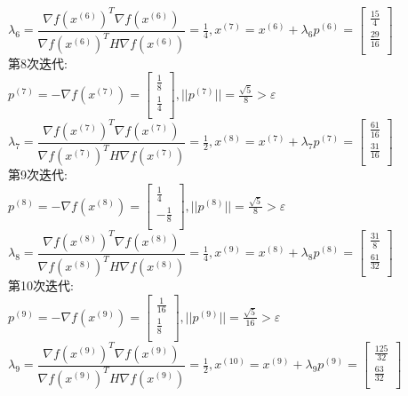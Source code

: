 \begin{solution}
    $\lambda_6=\dfrac{\nabla f(x^{(6)})^T\nabla f(x^{(6)})}{\nabla f(x^{(6)})^TH\nabla f(x^{(6)})}=\frac{1}{4},x^{(7)}=x^{(6)}+\lambda_6p^{(6)}=\begin{bmatrix} \frac{15}{4}\\\frac{29}{16}\\\end{bmatrix}$\\
    第8次迭代:\\
    $p^{(7)}=-\nabla f(x^{(7)})=\begin{bmatrix} \frac{1}{8}\\\frac{1}{4}\\\end{bmatrix},||p^{(7)}||=\frac{\sqrt{5}}{8}>\varepsilon$\\
    $\lambda_7=\dfrac{\nabla f(x^{(7)})^T\nabla f(x^{(7)})}{\nabla f(x^{(7)})^TH\nabla f(x^{(7)})}=\frac{1}{2},x^{(8)}=x^{(7)}+\lambda_7p^{(7)}=\begin{bmatrix} \frac{61}{16}\\\frac{31}{16}\\\end{bmatrix}$\\
    第9次迭代:\\
    $p^{(8)}=-\nabla f(x^{(8)})=\begin{bmatrix} \frac{1}{4}\\-\frac{1}{8}\\\end{bmatrix},||p^{(8)}||=\frac{\sqrt{5}}{8}>\varepsilon$\\
    $\lambda_8=\dfrac{\nabla f(x^{(8)})^T\nabla f(x^{(8)})}{\nabla f(x^{(8)})^TH\nabla f(x^{(8)})}=\frac{1}{4},x^{(9)}=x^{(8)}+\lambda_8p^{(8)}=\begin{bmatrix} \frac{31}{8}\\\frac{61}{32}\\\end{bmatrix}$\\
    第10次迭代:\\
    $p^{(9)}=-\nabla f(x^{(9)})=\begin{bmatrix} \frac{1}{16}\\\frac{1}{8}\\\end{bmatrix},||p^{(9)}||=\frac{\sqrt{5}}{16}>\varepsilon$\\
    $\lambda_9=\dfrac{\nabla f(x^{(9)})^T\nabla f(x^{(9)})}{\nabla f(x^{(9)})^TH\nabla f(x^{(9)})}=\frac{1}{2},x^{(10)}=x^{(9)}+\lambda_9p^{(9)}=\begin{bmatrix} \frac{125}{32}\\\frac{63}{32}\\\end{bmatrix}$\\

\end{solution}
